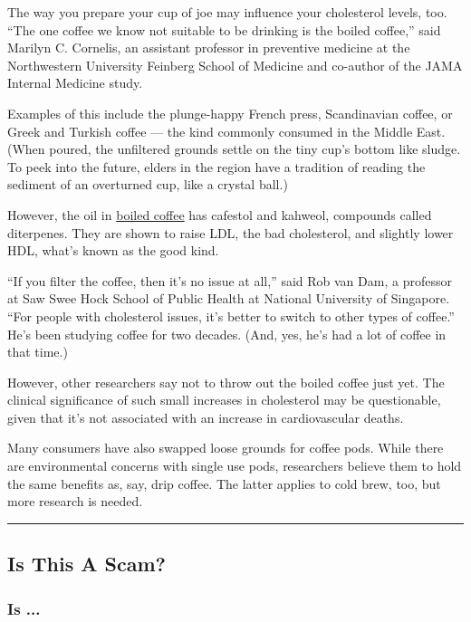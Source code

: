 The way you prepare your cup of joe may influence your cholesterol
levels, too. ``The one coffee we know not suitable to be drinking is the
boiled coffee,'' said Marilyn C. Cornelis, an assistant professor in
preventive medicine at the Northwestern University Feinberg School of
Medicine and co-author of the JAMA Internal Medicine study.

Examples of this include the plunge-happy French press, Scandinavian
coffee, or Greek and Turkish coffee --- the kind commonly consumed in
the Middle East. (When poured, the unfiltered grounds settle on the tiny
cup's bottom like sludge. To peek into the future, elders in the region
have a tradition of reading the sediment of an overturned cup, like a
crystal ball.)

However, the oil in
\href{https://www.sciencedirect.com/science/article/abs/pii/S0021915097000993}{boiled
coffee} has cafestol and kahweol, compounds called diterpenes. They are
shown to raise LDL, the bad cholesterol, and slightly lower HDL, what's
known as the good kind.

``If you filter the coffee, then it's no issue at all,'' said Rob van
Dam, a professor at Saw Swee Hock School of Public Health at National
University of Singapore. ``For people with cholesterol issues, it's
better to switch to other types of coffee.'' He's been studying coffee
for two decades. (And, yes, he's had a lot of coffee in that time.)

However, other researchers say not to throw out the boiled coffee just
yet. The clinical significance of such small increases in cholesterol
may be questionable, given that it's not associated with an increase in
cardiovascular deaths.

Many consumers have also swapped loose grounds for coffee pods. While
there are environmental concerns with single use pods, researchers
believe them to hold the same benefits as, say, drip coffee. The latter
applies to cold brew, too, but more research is needed.

\begin{center}\rule{0.5\linewidth}{\linethickness}\end{center}

\hypertarget{is-this-a-scam}{%
\subsection{Is This A Scam?}\label{is-this-a-scam}}

\hypertarget{is-}{%
\subsubsection{Is ...}\label{is-}}

